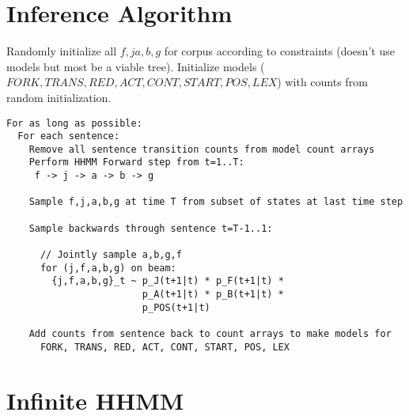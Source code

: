 \documentclass[12pt]{article}
\begin{document}
\clearpage
\section{Inference Algorithm}


Randomly initialize all $f, j a, b, g$ for corpus according to constraints (doesn't use models but most be a viable tree). Initialize models ($FORK, TRANS, RED, ACT, CONT, START, POS, LEX$) with counts from random initialization.

\begin{samepage}
\begin{verbatim}
For as long as possible:
  For each sentence:
    Remove all sentence transition counts from model count arrays
    Perform HHMM Forward step from t=1..T:
     f -> j -> a -> b -> g
  
    Sample f,j,a,b,g at time T from subset of states at last time step
  
    Sample backwards through sentence t=T-1..1:
    
      // Jointly sample a,b,g,f
      for (j,f,a,b,g) on beam:
        {j,f,a,b,g}_t ~ p_J(t+1|t) * p_F(t+1|t) *
        			    p_A(t+1|t) * p_B(t+1|t) *
                        p_POS(t+1|t)
      
    Add counts from sentence back to count arrays to make models for
      FORK, TRANS, RED, ACT, CONT, START, POS, LEX
\end{verbatim}
\end{samepage}

\section{Infinite HHMM}

\begin{figure}[t]

\end{figure}
\end{document}
